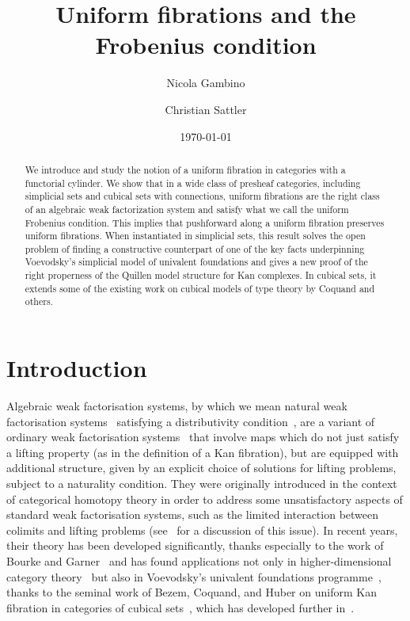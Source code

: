 \documentclass[reqno,10pt,a4paper,oneside,draft]{amsart}
\title{Uniform fibrations and the Frobenius condition}
\begin{document}
\begin{abstract}
We introduce and study the notion of a uniform fibration in categories with a functorial cylinder.
We show that in a wide class of presheaf categories, including simplicial sets and cubical sets with connections, uniform fibrations are the right class of an algebraic weak factorization system and satisfy what we call the uniform Frobenius condition.
This implies that pushforward along a uniform fibration preserves uniform fibrations.
When instantiated in simplicial sets, this result solves the open problem of
finding a constructive counterpart of one of the key facts underpinning Voevodsky's simplicial model of univalent foundations and gives a new proof of the right properness of
the Quillen model structure for Kan complexes. In cubical sets, it extends some of the existing work on cubical models of type theory by Coquand and others.
\end{abstract}

\author{Nicola Gambino}
\address{School of Mathematics, University of Leeds, Leeds LS2 9JT, UK}

\author{Christian Sattler}
\address{School of Mathematics, University of Leeds, Leeds LS2 9JT, UK}

\date{\today}

\maketitle


\section*{Introduction}


Algebraic weak factorisation systems, by which we mean natural weak
factorisation systems~\cite{grandis-tholen-nwfs} satisfying a
distributivity condition~\cite{garner:small-object-argument}, 
are a variant of ordinary weak factorisation systems~\cite{bousfield-wfs}
that involve maps which do not just satisfy a  lifting property (as in the definition of a Kan fibration), but are equipped with additional structure, given by an explicit choice of solutions for   lifting problems, subject to a naturality condition.
They were originally introduced  in the context of categorical homotopy theory in order to address some unsatisfactory aspects of standard weak factorisation systems, such as the limited interaction between colimits and lifting problems (see~\cite[Chapter~12]{riehl-cat-homotopy} for a discussion of this issue). 
In recent years, their theory has been developed significantly, thanks especially 
to the work of Bourke and Garner~\cite{bourke-garner-I,bourke-garner-II} and has found applications not only in 
higher-dimensional category theory~\cite{batanin-cisinski-weber} but also in Voevodsky's univalent foundations programme~\cite{voevodsky:uf}, thanks to the seminal work of  Bezem, Coquand, and Huber on uniform Kan fibration in categories of cubical sets~\cite{coquand-cubical-sets},
which has developed further in~\cite{awodey-cubical,cohen-et-al:cubicaltt,pitts-cubical-nominal,swan-awfs}.  
\end{document}

